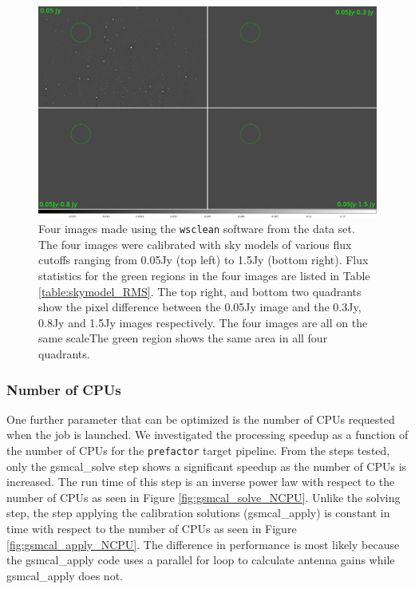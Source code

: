 \begin{figure}
    \includegraphics[width=0.95\linewidth]{figures/difference_4.png}
      \caption{Four images made using the \texttt{wsclean} software \citep{wsclean} from the data set\protect\footnotemark. The four images were calibrated with sky models of various flux cutoffs ranging from 0.05Jy (top left) to 1.5Jy (bottom right). Flux statistics for the green regions in the four images are listed in Table \ref{table:skymodel_RMS}. The top right, and bottom two quadrants show the pixel difference between the 0.05Jy image and the 0.3Jy, 0.8Jy and 1.5Jy images respectively. The four images are all on the same scaleThe green region shows the same area in all four quadrants.  }
	\label{fig:skymodel_images}
\end{figure}



\subsubsection{Number of CPUs}
One further parameter that can be optimized is the number of CPUs requested when the job is launched. We investigated the processing speedup as a function of the number of CPUs for the \texttt{prefactor} target pipeline. From the steps tested, only the {\selectfont gsmcal\_solve} step shows a significant speedup as the number of CPUs is increased. The run time of this step is an inverse power law with respect to the number of CPUs as seen in Figure \ref{fig:gsmcal_solve_NCPU}. Unlike the solving step, the step applying the calibration solutions ({\selectfont gsmcal\_apply}) is constant in time with respect to the number of CPUs as seen in Figure \ref{fig:gsmcal_apply_NCPU}. The difference in performance is most likely because the {\selectfont gsmcal\_apply} code uses a parallel for loop to calculate antenna gains while {\selectfont gsmcal\_apply} does not. 

